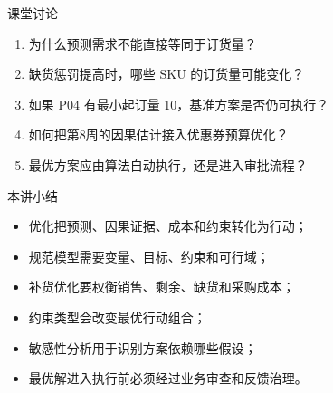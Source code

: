 \documentclass[UTF8,fontset=fandol,aspectratio=169,11pt]{ctexbeamer}
\begin{document}
\begin{frame}{课堂讨论}
\begin{enumerate}
  \item 为什么预测需求不能直接等同于订货量？
  \item 缺货惩罚提高时，哪些 SKU 的订货量可能变化？
  \item 如果 P04 有最小起订量 10，基准方案是否仍可执行？
  \item 如何把第8周的因果估计接入优惠券预算优化？
  \item 最优方案应由算法自动执行，还是进入审批流程？
\end{enumerate}
\end{frame}

\begin{frame}{本讲小结}
\begin{itemize}
  \item 优化把预测、因果证据、成本和约束转化为行动；
  \item 规范模型需要变量、目标、约束和可行域；
  \item 补货优化要权衡销售、剩余、缺货和采购成本；
  \item 约束类型会改变最优行动组合；
  \item 敏感性分析用于识别方案依赖哪些假设；
  \item 最优解进入执行前必须经过业务审查和反馈治理。
\end{itemize}
\end{frame}
\end{document}
